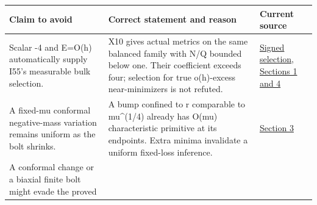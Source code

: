 \documentclass[
  10pt,
]{article}
\begin{document}
\begin{longtable}[]{@{}>{\raggedright\arraybackslash}p{\dimexpr(\linewidth-4\tabcolsep)/3\relax}>{\raggedright\arraybackslash}p{\dimexpr(\linewidth-4\tabcolsep)/3\relax}>{\raggedright\arraybackslash}p{\dimexpr(\linewidth-4\tabcolsep)/3\relax}@{}}
\toprule
\begin{minipage}[b]{0.30\columnwidth}\raggedright
Claim to avoid\strut
\end{minipage} & \begin{minipage}[b]{0.30\columnwidth}\raggedright
Correct statement and reason\strut
\end{minipage} & \begin{minipage}[b]{0.30\columnwidth}\raggedright
Current source\strut
\end{minipage}\tabularnewline
\midrule
\endhead
\begin{minipage}[t]{0.30\columnwidth}\raggedright
Scalar -4 and E=O(h) automatically supply I55's measurable bulk
selection.\strut
\end{minipage} & \begin{minipage}[t]{0.30\columnwidth}\raggedright
X10 gives actual metrics on the same balanced family with N/Q bounded
below one. Their coefficient exceeds four; selection for true
o(h)-excess near-minimizers is not refuted.\strut
\end{minipage} & \begin{minipage}[t]{0.30\columnwidth}\raggedright
\href{../continuation/20260928_signed_characteristic_selection.md}{Signed
selection, Sections 1 and 4}\strut
\end{minipage}\tabularnewline
\begin{minipage}[t]{0.30\columnwidth}\raggedright
A fixed-mu conformal negative-mass variation remains uniform as the bolt
shrinks.\strut
\end{minipage} & \begin{minipage}[t]{0.30\columnwidth}\raggedright
A bump confined to r comparable to mu\^{}(1/4) already has O(mu)
characteristic primitive at its endpoints. Extra minima invalidate a
uniform fixed-loss inference.\strut
\end{minipage} & \begin{minipage}[t]{0.30\columnwidth}\raggedright
\href{../continuation/20260928_signed_characteristic_selection.md}{Section
3}\strut
\end{minipage}\tabularnewline
\begin{minipage}[t]{0.30\columnwidth}\raggedright
A conformal change or a biaxial finite bolt might evade the proved

\end{minipage}
\end{longtable}
\end{document}
